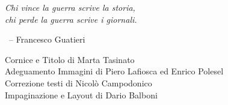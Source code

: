 \begin{myquote}\it
  Chi vince la guerra scrive la storia,\\
  chi perde la guerra scrive i giornali.
  
  {~\hfill\normalfont -- Francesco Guatieri}
\end{myquote}

\vfill

\begin{adjustwidth}{\sectionnumlen}{}\fontsize{10}{15}\selectfont
  Cornice e Titolo di Marta Tasinato\\
  Adeguamento Immagini di Piero Lafiosca ed Enrico Polesel\\
  Correzione testi di Nicolò Campodonico\\
  Impaginazione e Layout di Dario Balboni
\end{adjustwidth}
\clearpage

